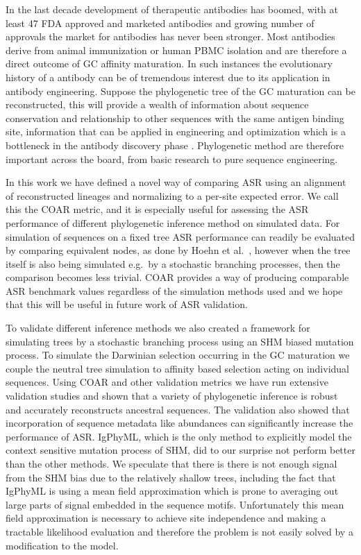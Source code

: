 In the last decade development of therapeutic antibodies has boomed, with at least 47 FDA approved and marketed antibodies and growing number of approvals \cite{ecker2015therapeutic} the market for antibodies has never been stronger.
Most antibodies derive from animal immunization or human PBMC isolation \cite{reichert2012marketed} and are therefore a direct outcome of GC affinity maturation.
In such instances the evolutionary history of a antibody can be of tremendous interest due to its application in antibody engineering.
Suppose the phylogenetic tree of the GC maturation can be reconstructed, this will provide a wealth of information about sequence conservation and relationship to other sequences with the same antigen binding site, information that can be applied in engineering and optimization which is a bottleneck in the antibody discovery phase \cite{dubel2014handbook}.
Phylogenetic method are therefore important across the board, from basic research to pure sequence engineering.

In this work we have defined a novel way of comparing ASR using an alignment of reconstructed lineages and normalizing to a per-site expected error.
We call this the COAR metric, and it is especially useful for assessing the ASR performance of different phylogenetic inference method on simulated data.
For simulation of sequences on a fixed tree ASR performance can readily be evaluated by comparing equivalent nodes, as done by Hoehn et al.\ \cite{Hoehn2016-wg}, however when the tree itself is also being simulated e.g.\ by a stochastic branching processes, then the comparison becomes less trivial.
COAR provides a way of producing comparable ASR benchmark values regardless of the simulation methods used and we hope that this will be useful in future work of ASR validation.

To validate different inference methods we also created a framework for simulating trees by a stochastic branching process using an SHM biased mutation process.
To simulate the Darwinian selection occurring in the GC maturation we couple the neutral tree simulation to affinity based selection acting on individual sequences.
Using COAR and other validation metrics we have run extensive validation studies and shown that a variety of phylogenetic inference is robust and accurately reconstructs ancestral sequences.
The validation also showed that incorporation of sequence metadata like abundances can significantly increase the performance of ASR.
IgPhyML, which is the only method to explicitly model the context sensitive mutation process of SHM, did to our surprise not perform better than the other methods.
We speculate that there is there is not enough signal from the SHM bias due to the relatively shallow trees, including the fact that IgPhyML is using a mean field approximation which is prone to averaging out large parts of signal embedded in the sequence motifs.
Unfortunately this mean field approximation is necessary to achieve site independence and making a tractable likelihood evaluation and therefore the problem is not easily solved by a modification to the model.

